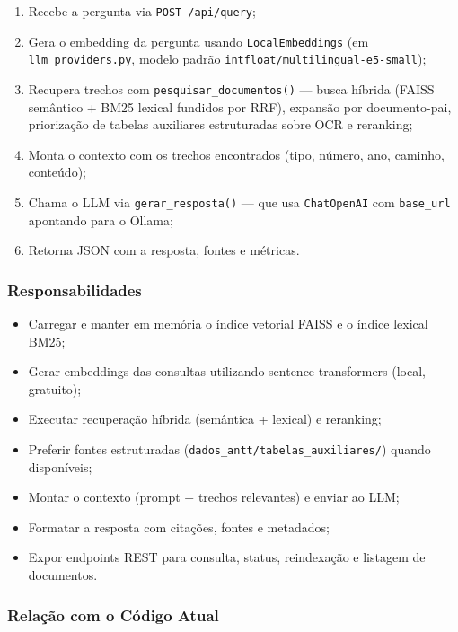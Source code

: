 \documentclass[12pt, a4paper]{article}
\begin{document}
\begin{enumerate}[label=\textbf{\arabic*.}]
  \item Recebe a pergunta via \texttt{POST /api/query};
  \item Gera o embedding da pergunta usando \texttt{LocalEmbeddings} (em \texttt{llm\_providers.py}, modelo padrão \texttt{intfloat/multilingual-e5-small});
  \item Recupera trechos com \texttt{pesquisar\_documentos()} --- busca híbrida (FAISS semântico + BM25 lexical fundidos por RRF), expansão por documento-pai, priorização de tabelas auxiliares estruturadas sobre OCR e reranking;
  \item Monta o contexto com os trechos encontrados (tipo, número, ano, caminho, conteúdo);
  \item Chama o LLM via \texttt{gerar\_resposta()} --- que usa \texttt{ChatOpenAI} com \texttt{base\_url} apontando para o Ollama;
  \item Retorna JSON com a resposta, fontes e métricas.
\end{enumerate}

\subsubsection*{Responsabilidades}

\begin{itemize}
  \item Carregar e manter em memória o índice vetorial FAISS e o índice lexical BM25;
  \item Gerar embeddings das consultas utilizando sentence-transformers (local, gratuito);
  \item Executar recuperação híbrida (semântica + lexical) e reranking;
  \item Preferir fontes estruturadas (\texttt{dados\_antt/tabelas\_auxiliares/}) quando disponíveis;
  \item Montar o contexto (prompt + trechos relevantes) e enviar ao LLM;
  \item Formatar a resposta com citações, fontes e metadados;
  \item Expor endpoints REST para consulta, status, reindexação e listagem de documentos.
\end{itemize}

\subsubsection*{Relação com o Código Atual}
\end{document}
